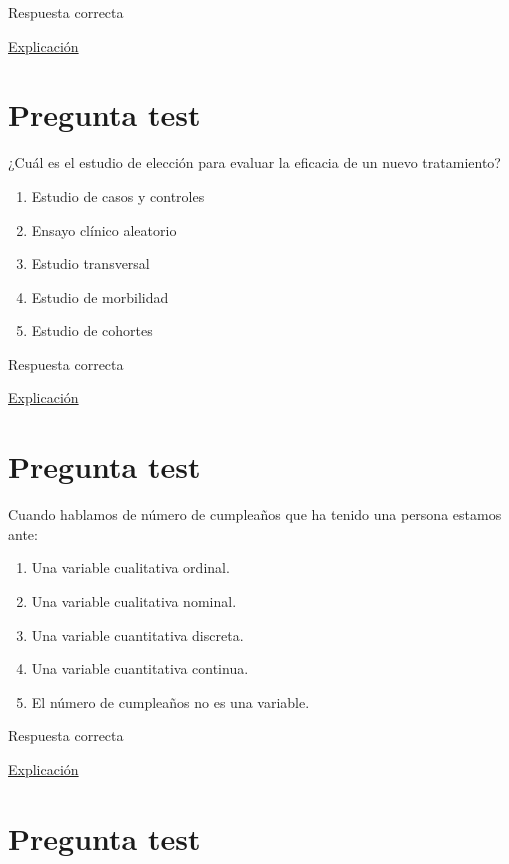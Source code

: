 \documentclass[
]{book}
\providecommand{\tightlist}{%
  \setlength{\itemsep}{0pt}\setlength{\parskip}{0pt}}
\begin{document}
Respuesta correcta

\href{https://1fjmanzano.github.io/bioestadistica/tipos-de-variables.html}{Explicación}

\hypertarget{pregunta-test-31}{%
\section{Pregunta test}\label{pregunta-test-31}}

¿Cuál es el estudio de elección para evaluar la eficacia de un nuevo tratamiento?

\begin{enumerate}
\def\labelenumi{\alph{enumi})}
\tightlist
\item
  Estudio de casos y controles
\item
  Ensayo clínico aleatorio
\item
  Estudio transversal
\item
  Estudio de morbilidad
\item
  Estudio de cohortes
\end{enumerate}

Respuesta correcta

\href{https://www.cancer.gov/espanol/publicaciones/diccionarios/diccionario-cancer/def/ensayo-clinico-aleatorizado}{Explicación}

\hypertarget{pregunta-test-32}{%
\section{Pregunta test}\label{pregunta-test-32}}

Cuando hablamos de número de cumpleaños que ha tenido una persona estamos ante:

\begin{enumerate}
\def\labelenumi{\alph{enumi})}
\tightlist
\item
  Una variable cualitativa ordinal.
\item
  Una variable cualitativa nominal.
\item
  Una variable cuantitativa discreta.
\item
  Una variable cuantitativa continua.
\item
  El número de cumpleaños no es una variable.
\end{enumerate}

Respuesta correcta

\href{https://1fjmanzano.github.io/bioestadistica/tipos-de-variables.html}{Explicación}

\hypertarget{pregunta-test-33}{%
\section{Pregunta test}\label{pregunta-test-33}}
\end{document}
